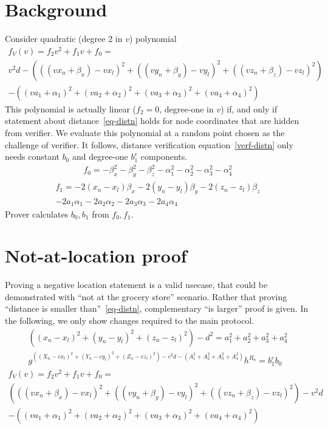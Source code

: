 \documentclass[a4paper,12pt]{article}
\begin{document}
\section{Background}

Consider quadratic (degree 2 in $v$) polynomial
\begin{multline}
  f_V(v) = f_2 v^2 + f_1 v + f_0 = \\
  v^2 d - (((v x_n + \beta_x) - v x_l)^2 +
           ((v y_n + \beta_y) - v y_l)^2 +
           ((v z_n + \beta_z) - v z_l)^2)  \\
        - ((v a_1 + \alpha_1)^2 +
           (v a_2 + \alpha_2)^2 +
           (v a_3 + \alpha_3)^2 +
           (v a_4 + \alpha_4)^2)
\end{multline}
This polynomial is actually linear ($f_2 = 0$, degree-one in $v$)
if, and only if
statement about distance~\eqref{eq-distn} holds for node coordinates that are hidden from verifier.
We evaluate this polynomial at a random point chosen as the challenge of verifier.
It follows, distance verification equation~\eqref{verf-distn}
only needs constant $b_0$ and degree-one $b_1^c$ components.
\begin{gather}
  f_0 = -\beta_x^2 - \beta_y^2 - \beta_z^2 - \alpha_1^2 - \alpha_2^2 - \alpha_3^2 - \alpha_4^2
\end{gather}
\begin{multline}
  f_1 = -2 (x_n - x_l) \beta_x  -2 (y_n - y_l) \beta_y  -2 (z_n - z_l) \beta_z \\
        -2 a_1 \alpha_1 -2 a_2 \alpha_2 -2 a_3 \alpha_3 -2 a_4 \alpha_4
\end{multline}
Prover calculates $b_0, b_1$ from $f_0, f_1$.

\section{Not-at-location proof}

Proving a negative location statement is a valid usecase,
that could be demonstrated with ``not at the grocery store'' scenario.
Rather that proving ``distance is smaller than''~\eqref{eq-distn},
complementary ``is larger'' proof is given. %
In the following, we only show changes required to the main protocol.
\begin{gather}
\label{eq-distn-more}
  ((x_n - x_l)^2 + (y_n - y_l)^2 + (z_n - z_l)^2) - d^2 = a_1^2 + a_2^2 + a_3^2 + a_4^2  \\
\label{verf-distn-more}
  g^{((X_n - c x_l)^2 + (Y_n - c y_l)^2 + (Z_n - c z_l)^2 ) - c^2 d - (A_1^2 + A_2^2 + A_3^2 + A_4^2)} h^{R_a} = b_1^{c} b_0 
\end{gather}
\begin{multline}
\label{eq-coeff-more}
  f_V(v) = f_2 v^2 + f_1 v + f_0 = \\
  (((v x_n + \beta_x) - v x_l)^2 +
   ((v y_n + \beta_y) - v y_l)^2 +
   ((v z_n + \beta_z) - v z_l)^2)
  - v^2 d \\
  - ((v a_1 + \alpha_1)^2 +
     (v a_2 + \alpha_2)^2 +
     (v a_3 + \alpha_3)^2 +
     (v a_4 + \alpha_4)^2)
\end{multline}
\end{document}

